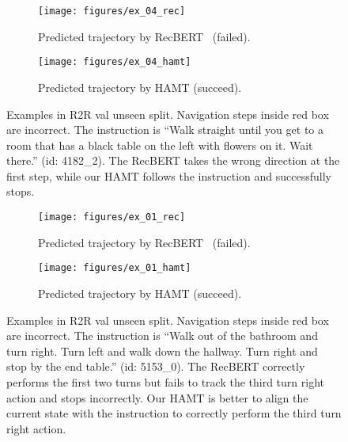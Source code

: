 \begin{figure}
	\centering
	\begin{subfigure}[b]{0.48\textwidth}
		\centering
		\texttt{[image: figures/ex\_04\_rec]}
		\caption{Predicted trajectory by RecBERT~\cite{hong2020recurrent} (failed).}
		\label{fig:ex_04_rec}
	\end{subfigure}
	\hfill
	\begin{subfigure}[b]{0.48\textwidth}
		\centering
		\texttt{[image: figures/ex\_04\_hamt]}
		\caption{Predicted trajectory by HAMT (succeed).}
		\label{fig:ex_04_hamt}
	\end{subfigure}
	\caption{Examples in R2R val unseen split. Navigation steps inside red box are incorrect. The instruction is ``Walk straight until you get to a room that has a black table on the left with flowers on it. Wait there.'' (id: 4182\_2). The RecBERT takes the wrong direction at the first step, while our HAMT follows the instruction and successfully stops.}
	\label{fig:ex_04}
\end{figure}

\begin{figure}
	\centering
	\begin{subfigure}[b]{0.48\textwidth}
		\centering
		\texttt{[image: figures/ex\_01\_rec]}
		\caption{Predicted trajectory by RecBERT~\cite{hong2020recurrent} (failed).}
		\label{fig:ex_01_rec}
	\end{subfigure}
	\hfill
	\begin{subfigure}[b]{0.48\textwidth}
		\centering
		\texttt{[image: figures/ex\_01\_hamt]}
		\caption{Predicted trajectory by HAMT (succeed).}
		\label{fig:ex_01_hamt}
	\end{subfigure}
	\caption{Examples in R2R val unseen split. Navigation steps inside red box are incorrect. The instruction is ``Walk out of the bathroom and turn right. Turn left and walk down the hallway. Turn right and stop by the end table.'' (id: 5153\_0). The RecBERT correctly performs the first two turns but fails to track the third turn right action and stops incorrectly. Our HAMT is better to align the current state with the instruction to correctly perform  the third turn right action.}
	\label{fig:ex_01}
\end{figure}

